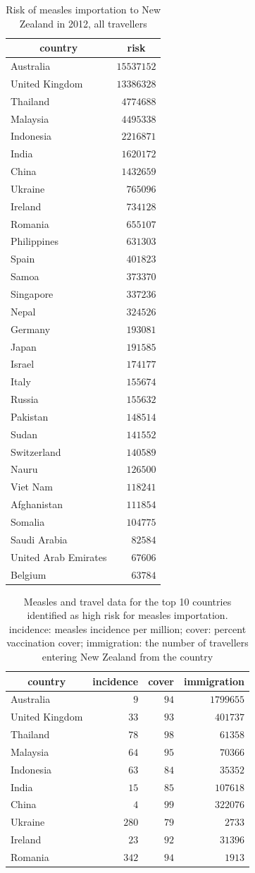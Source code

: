 \documentclass{article}
\begin{document}
\begin{table}
\caption{Risk of measles importation to New Zealand in 2012, all travellers}
\begin{center}
\begin{tabular}{lr}
\hline\hline
\multicolumn{1}{c}{country}&\multicolumn{1}{c}{risk}\tabularnewline
\hline
Australia&$15537152$\tabularnewline
United Kingdom&$13386328$\tabularnewline
Thailand&$ 4774688$\tabularnewline
Malaysia&$ 4495338$\tabularnewline
Indonesia&$ 2216871$\tabularnewline
India&$ 1620172$\tabularnewline
China&$ 1432659$\tabularnewline
Ukraine&$  765096$\tabularnewline
Ireland&$  734128$\tabularnewline
Romania&$  655107$\tabularnewline
Philippines&$  631303$\tabularnewline
Spain&$  401823$\tabularnewline
Samoa&$  373370$\tabularnewline
Singapore&$  337236$\tabularnewline
Nepal&$  324526$\tabularnewline
Germany&$  193081$\tabularnewline
Japan&$  191585$\tabularnewline
Israel&$  174177$\tabularnewline
Italy&$  155674$\tabularnewline
Russia&$  155632$\tabularnewline
Pakistan&$  148514$\tabularnewline
Sudan&$  141552$\tabularnewline
Switzerland&$  140589$\tabularnewline
Nauru&$  126500$\tabularnewline
Viet Nam&$  118241$\tabularnewline
Afghanistan&$  111854$\tabularnewline
Somalia&$  104775$\tabularnewline
Saudi Arabia&$   82584$\tabularnewline
United Arab Emirates&$   67606$\tabularnewline
Belgium&$   63784$\tabularnewline
\hline
\end{tabular}\end{center}\label{table:risk12}
\end{table}



\begin{table}
\caption{Measles and travel data for the top 10 countries identified as high risk for measles importation. incidence: measles incidence per million; cover: percent vaccination cover; immigration: the number of travellers entering New Zealand from the country}
\begin{center}
\begin{tabular}{lrrr}
\hline\hline
\multicolumn{1}{c}{country}&\multicolumn{1}{c}{incidence}&\multicolumn{1}{c}{cover}&\multicolumn{1}{c}{immigration}\tabularnewline
\hline
Australia&$  9$&$94$&$1799655$\tabularnewline
United Kingdom&$ 33$&$93$&$ 401737$\tabularnewline
Thailand&$ 78$&$98$&$  61358$\tabularnewline
Malaysia&$ 64$&$95$&$  70366$\tabularnewline
Indonesia&$ 63$&$84$&$  35352$\tabularnewline
India&$ 15$&$85$&$ 107618$\tabularnewline
China&$  4$&$99$&$ 322076$\tabularnewline
Ukraine&$280$&$79$&$   2733$\tabularnewline
Ireland&$ 23$&$92$&$  31396$\tabularnewline
Romania&$342$&$94$&$   1913$\tabularnewline
\hline
\end{tabular}\end{center}\label{table:toprisk}
\end{table}
\end{document}
